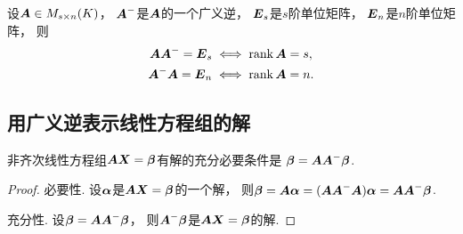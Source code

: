 \begin{proposition}
设\(\boldsymbol{A} \in M_{s \times n}(K)\)，
\(\boldsymbol{A}^-\)是\(\boldsymbol{A}\)的一个广义逆，
\(\boldsymbol{E}_s\)是\(s\)阶单位矩阵，
\(\boldsymbol{E}_n\)是\(n\)阶单位矩阵，
则\begin{gather*}
	\boldsymbol{A} \boldsymbol{A}^- = \boldsymbol{E}_s
	\iff
	\rank\boldsymbol{A} = s, \\
	\boldsymbol{A}^- \boldsymbol{A} = \boldsymbol{E}_n
	\iff
	\rank\boldsymbol{A} = n.
\end{gather*}
\end{proposition}

\subsection{用广义逆表示线性方程组的解}
\begin{theorem}[非齐次线性方程组的相容性定理]\label{theorem:线性方程组.非齐次线性方程组的相容性定理}
非齐次线性方程组\(\boldsymbol{A} \boldsymbol{X} = \boldsymbol\beta\)有解的充分必要条件是
\(\boldsymbol\beta = \boldsymbol{A} \boldsymbol{A}^- \boldsymbol\beta\).
\begin{proof}
必要性.
设\(\boldsymbol\alpha\)是\(\boldsymbol{A} \boldsymbol{X} = \boldsymbol\beta\)的一个解，
则\(
	\boldsymbol\beta
	= \boldsymbol{A} \boldsymbol\alpha
	= (\boldsymbol{A} \boldsymbol{A}^- \boldsymbol{A}) \boldsymbol\alpha
	= \boldsymbol{A} \boldsymbol{A}^- \boldsymbol\beta
\).

充分性.
设\(\boldsymbol\beta = \boldsymbol{A} \boldsymbol{A}^- \boldsymbol\beta\)，
则\(\boldsymbol{A}^- \boldsymbol\beta\)是\(\boldsymbol{A} \boldsymbol{X} = \boldsymbol\beta\)的解.
\end{proof}
\end{theorem}

